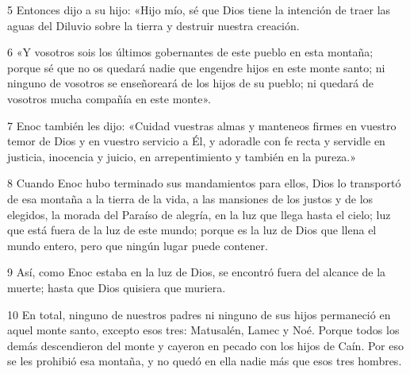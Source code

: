 \par 5 Entonces dijo a su hijo: «Hijo mío, sé que Dios tiene la intención de traer las aguas del Diluvio sobre la tierra y destruir nuestra creación.

\par 6 «Y vosotros sois los últimos gobernantes de este pueblo en esta montaña; porque sé que no os quedará nadie que engendre hijos en este monte santo; ni ninguno de vosotros se enseñoreará de los hijos de su pueblo; ni quedará de vosotros mucha compañía en este monte».

\par 7 Enoc también les dijo: «Cuidad vuestras almas y manteneos firmes en vuestro temor de Dios y en vuestro servicio a Él, y adoradle con fe recta y servidle en justicia, inocencia y juicio, en arrepentimiento y también en la pureza.»

\par 8 Cuando Enoc hubo terminado sus mandamientos para ellos, Dios lo transportó de esa montaña a la tierra de la vida, a las mansiones de los justos y de los elegidos, la morada del Paraíso de alegría, en la luz que llega hasta el cielo; luz que está fuera de la luz de este mundo; porque es la luz de Dios que llena el mundo entero, pero que ningún lugar puede contener.

\par 9 Así, como Enoc estaba en la luz de Dios, se encontró fuera del alcance de la muerte; hasta que Dios quisiera que muriera.

\par 10 En total, ninguno de nuestros padres ni ninguno de sus hijos permaneció en aquel monte santo, excepto esos tres: Matusalén, Lamec y Noé. Porque todos los demás descendieron del monte y cayeron en pecado con los hijos de Caín. Por eso se les prohibió esa montaña, y no quedó en ella nadie más que esos tres hombres.


